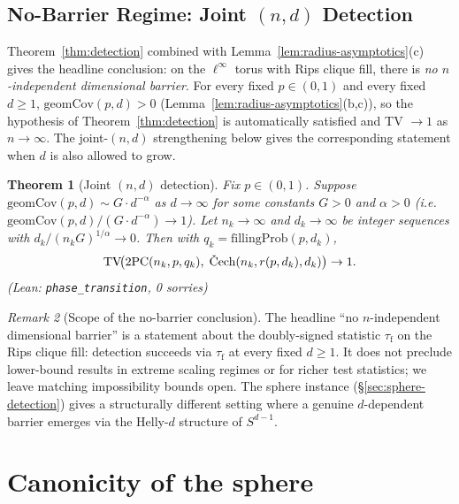 \documentclass[reqno,12pt]{amsart}
\newcommand{\tauf}{\tau_{\mathrm{f}}}
\newcommand{\PC}{\mathrm{2PC}}
\newcommand{\Cech}{\ifmmode\text{\v{C}ech}\else\v{C}ech\fi}  %
\newcommand{\TV}{\mathrm{TV}}
\newcommand{\geomCov}{\mathrm{geomCov}}
\newcommand{\fillingP}{\mathrm{fillingProb}}
\newcommand{\leanverified}[1]{\textup{(Lean: \texttt{#1}, 0 sorries)}}
\theoremstyle{plain}
\newtheorem{theorem}{Theorem}[section]
\theoremstyle{definition}
\theoremstyle{remark}
\newtheorem{remark}[theorem]{Remark}
\begin{document}
\subsection{No-Barrier Regime: Joint $(n, d)$ Detection}

Theorem~\ref{thm:detection} combined with Lemma~\ref{lem:radius-asymptotics}(c) gives
the headline conclusion: on the $\ell^\infty$ torus with Rips clique fill, there is
\emph{no $n$-independent dimensional barrier}. For every fixed $p \in (0,1)$ and every
fixed $d \ge 1$, $\geomCov(p, d) > 0$ (Lemma~\ref{lem:radius-asymptotics}(b,c)), so the
hypothesis of Theorem~\ref{thm:detection} is automatically satisfied and TV $\to 1$ as
$n \to \infty$. The joint-$(n,d)$ strengthening below gives the corresponding statement
when $d$ is also allowed to grow.

\begin{theorem}[Joint $(n, d)$ detection]\label{thm:phase-transition}
Fix $p \in (0, 1)$. Suppose $\geomCov(p, d) \sim G \cdot d^{-\alpha}$ as $d \to \infty$
for some constants $G > 0$ and $\alpha > 0$ (i.e.\
$\geomCov(p, d) / (G \cdot d^{-\alpha}) \to 1$). Let $n_k \to \infty$ and $d_k \to \infty$
be integer sequences with $d_k / (n_k G)^{1/\alpha} \to 0$. Then with
$q_k = \fillingP(p, d_k)$,
\[
  \TV\!\bigl(\PC(n_k, p, q_k),\;
    \Cech(n_k, r(p, d_k), d_k)\bigr) \to 1.
\]
\hfill \leanverified{phase\_transition}
\end{theorem}

\begin{remark}[Scope of the no-barrier conclusion]\label{rem:tv-zero-caveat}
The headline ``no $n$-independent dimensional barrier'' is a statement about the
doubly-signed statistic $\tauf$ on the Rips clique fill: detection succeeds via $\tauf$ at
every fixed $d \ge 1$. It does not preclude lower-bound results in extreme scaling regimes
or for richer test statistics; we leave matching impossibility bounds open. The sphere
instance (\S\ref{sec:sphere-detection}) gives a structurally different setting where a
genuine $d$-dependent barrier emerges via the Helly-$d$ structure of $S^{d-1}$.
\end{remark}

\section{Canonicity of the sphere}\label{sec:canonicity}\label{sec:sister-instances}
\end{document}
